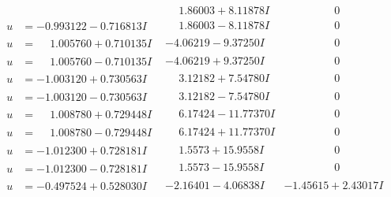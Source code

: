 \documentclass[1p]{elsarticle_modified}
\theoremstyle{definition}
\begin{document}
$$\begin{array}{c|c|c}
 & \phantom{-}1.86003 + 8.11878 I & \phantom{-0.000000 } 0 \\ \hline\begin{aligned}
u &= -0.993122 - 0.716813 I\end{aligned}
 & \phantom{-}1.86003 - 8.11878 I & \phantom{-0.000000 } 0 \\ \hline\begin{aligned}
u &= \phantom{-}1.005760 + 0.710135 I\end{aligned}
 & -4.06219 - 9.37250 I & \phantom{-0.000000 } 0 \\ \hline\begin{aligned}
u &= \phantom{-}1.005760 - 0.710135 I\end{aligned}
 & -4.06219 + 9.37250 I & \phantom{-0.000000 } 0 \\ \hline\begin{aligned}
u &= -1.003120 + 0.730563 I\end{aligned}
 & \phantom{-}3.12182 + 7.54780 I & \phantom{-0.000000 } 0 \\ \hline\begin{aligned}
u &= -1.003120 - 0.730563 I\end{aligned}
 & \phantom{-}3.12182 - 7.54780 I & \phantom{-0.000000 } 0 \\ \hline\begin{aligned}
u &= \phantom{-}1.008780 + 0.729448 I\end{aligned}
 & \phantom{-}6.17424 - 11.77370 I & \phantom{-0.000000 } 0 \\ \hline\begin{aligned}
u &= \phantom{-}1.008780 - 0.729448 I\end{aligned}
 & \phantom{-}6.17424 + 11.77370 I & \phantom{-0.000000 } 0 \\ \hline\begin{aligned}
u &= -1.012300 + 0.728181 I\end{aligned}
 & \phantom{-}1.5573 + 15.9558 I & \phantom{-0.000000 } 0 \\ \hline\begin{aligned}
u &= -1.012300 - 0.728181 I\end{aligned}
 & \phantom{-}1.5573 - 15.9558 I & \phantom{-0.000000 } 0 \\ \hline\begin{aligned}
u &= -0.497524 + 0.528030 I\end{aligned}
 & -2.16401 - 4.06838 I & -1.45615 + 2.43017 I \\ \hline\begin{aligned}

\end{aligned}
\end{array}$$
\end{document}
